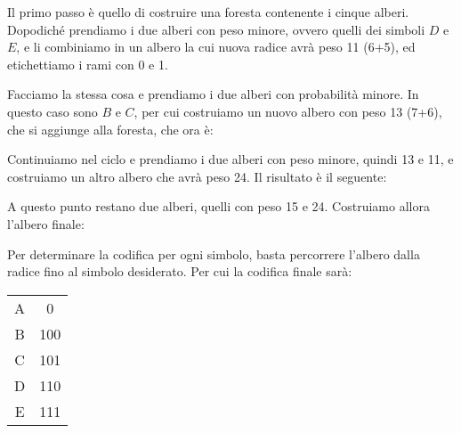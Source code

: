 Il primo passo è quello di costruire una foresta contenente i cinque alberi. Dopodiché prendiamo i due alberi con peso minore, ovvero quelli dei simboli \(D\) e \(E\), e li combiniamo in un albero la cui nuova radice avrà peso 11 (6+5), ed etichettiamo i rami con 0 e 1.

\begin{figure}[htbp!]
  \centering
  
\end{figure}
\FloatBarrier

Facciamo la stessa cosa e prendiamo i due alberi con probabilità minore. In questo caso sono \(B\) e \(C\), per cui costruiamo un nuovo albero con peso 13 (7+6), che si aggiunge alla foresta, che ora è:

\begin{figure}[htbp!]
  \centering
  
\end{figure}
\FloatBarrier

Continuiamo nel ciclo e prendiamo i due alberi con peso minore, quindi 13 e 11, e costruiamo un altro albero che avrà peso 24. Il risultato è il seguente:

\begin{figure}[htbp]
  \centering
  
\end{figure}

\FloatBarrier

A questo punto restano due alberi, quelli con peso 15 e 24. Costruiamo allora l'albero finale:

\begin{figure}[htbp!]
  \centering
  
\end{figure}

\FloatBarrier

Per determinare la codifica per ogni simbolo, basta percorrere l'albero dalla radice fino al simbolo desiderato. Per cui la codifica finale sarà:

\begin{table}[htbp!]
\centering
\begin{tabular}{cc}
A & 0    \\
B & 100  \\
C & 101  \\
D & 110  \\
E & 111 
\end{tabular}
\end{table}

